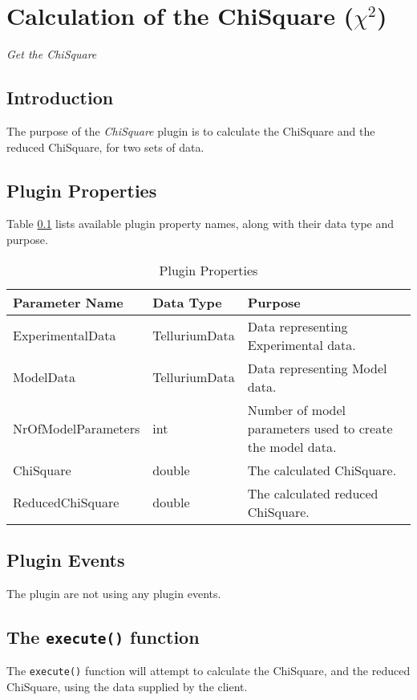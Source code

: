 \chapter*{Calculation of the ChiSquare ($\chi^2$)}
\setcounter{chapter}{1}
\emph{Get the ChiSquare}

\section{Introduction}
The purpose of the \emph{ChiSquare} plugin is to calculate the ChiSquare and the reduced ChiSquare, for two sets of data.
 
\section{Plugin Properties}
Table \ref{table:PluginProperties} lists available plugin property names, along with their data type and purpose.


\begin{table}[ht]
\centering %
\begin{tabular}{l l p{7.5cm}} %

Parameter Name & Data Type & Purpose \\ [0.5ex] %
\hline %
ExperimentalData		& 	TelluriumData   	& Data representing Experimental data. \\
ModelData 				& 	TelluriumData   	& Data representing Model data. \\
NrOfModelParameters		& 	int   				& Number of model parameters used to create the model data. \\
ChiSquare     			& 	double		   		& The calculated ChiSquare. \\
ReducedChiSquare 		& 	double		   		& The calculated reduced ChiSquare. \\

\hline %
\end{tabular}
\caption{Plugin Properties} 
\label{table:PluginProperties} 
\end{table}

\section{Plugin Events}
The plugin are not using any plugin events.

\section{The \texttt{execute()} function}
The \verb|execute()| function will attempt to calculate the ChiSquare, and the reduced ChiSquare, using the data supplied by the client. 

